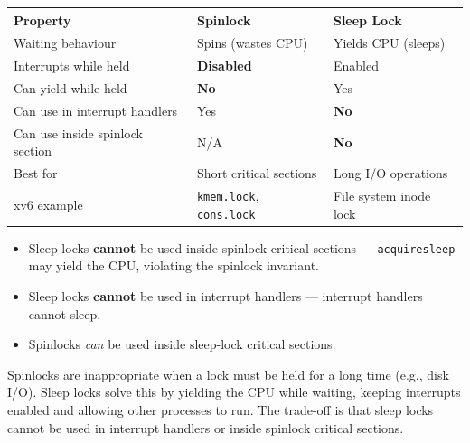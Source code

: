 \documentclass[11pt, a4paper]{article}
\begin{document}
\begin{center}
\renewcommand{\arraystretch}{1.3}
\begin{tabular}{@{}lll@{}}
\toprule
\textbf{Property}               & \textbf{Spinlock}   & \textbf{Sleep Lock} \\
\midrule
Waiting behaviour               & Spins (wastes CPU)  & Yields CPU (sleeps) \\
Interrupts while held           & \textbf{Disabled}   & Enabled \\
Can yield while held            & \textbf{No}         & Yes \\
Can use in interrupt handlers   & Yes                 & \textbf{No} \\
Can use inside spinlock section & N/A                 & \textbf{No} \\
Best for                        & Short critical sections & Long I/O operations \\
xv6 example                     & \lstinline|kmem.lock|, \lstinline|cons.lock| & File system inode lock \\
\bottomrule
\end{tabular}
\end{center}

\begin{tcolorbox}[warning, title={Sleep Lock Restrictions}]
\begin{itemize}[leftmargin=1.5em]
  \item Sleep locks \textbf{cannot} be used inside spinlock critical sections --- \lstinline|acquiresleep| may yield the CPU, violating the spinlock invariant.
  \item Sleep locks \textbf{cannot} be used in interrupt handlers --- interrupt handlers cannot sleep.
  \item Spinlocks \emph{can} be used inside sleep-lock critical sections.
\end{itemize}
\end{tcolorbox}

\begin{tcolorbox}[summary, title={Section Summary}]
Spinlocks are inappropriate when a lock must be held for a long time (e.g., disk I/O). Sleep locks solve this by yielding the CPU while waiting, keeping interrupts enabled and allowing other processes to run. The trade-off is that sleep locks cannot be used in interrupt handlers or inside spinlock critical sections.
\end{tcolorbox}

\end{document}

